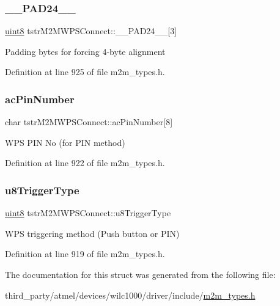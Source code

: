 \subsubsection{\texorpdfstring{\+\_\+\+\_\+\+P\+A\+D24\+\_\+\+\_\+}{\_\_PAD24\_\_}}
{\footnotesize\ttfamily \hyperlink{group__DataT_ga4df709a77647e870bbf1d955b8edc9a6}{uint8} tstr\+M2\+M\+W\+P\+S\+Connect\+::\+\_\+\+\_\+\+P\+A\+D24\+\_\+\+\_\+\mbox{[}3\mbox{]}}

Padding bytes for forcing 4-\/byte alignment 

Definition at line 925 of file m2m\+\_\+types.\+h.

\mbox{\label{structtstrM2MWPSConnect_a19e29b3be2a41d0fc275cac6751a43c1}} 
\subsubsection{\texorpdfstring{ac\+Pin\+Number}{acPinNumber}}
{\footnotesize\ttfamily char tstr\+M2\+M\+W\+P\+S\+Connect\+::ac\+Pin\+Number\mbox{[}8\mbox{]}}

W\+PS P\+IN No (for P\+IN method) 

Definition at line 922 of file m2m\+\_\+types.\+h.

\mbox{\label{structtstrM2MWPSConnect_a13e9ccc529ced2695c513e26af9bb052}} 
\subsubsection{\texorpdfstring{u8\+Trigger\+Type}{u8TriggerType}}
{\footnotesize\ttfamily \hyperlink{group__DataT_ga4df709a77647e870bbf1d955b8edc9a6}{uint8} tstr\+M2\+M\+W\+P\+S\+Connect\+::u8\+Trigger\+Type}

W\+PS triggering method (Push button or P\+IN) 

Definition at line 919 of file m2m\+\_\+types.\+h.



The documentation for this struct was generated from the following file\+:\begin{DoxyCompactItemize}
\item 
third\+\_\+party/atmel/devices/wilc1000/driver/include/\hyperlink{m2m__types_8h}{m2m\+\_\+types.\+h}\end{DoxyCompactItemize}
